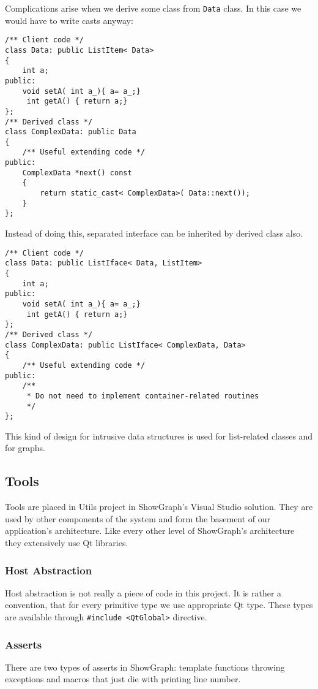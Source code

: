 \documentclass[11pt,twoside,a4paper]{article}
\begin{document}
Complications arise when we derive some class from \lstinline{Data} class. In this case we would have to write casts anyway:
\begin{lstlisting}
/** Client code */
class Data: public ListItem< Data> 
{
    int a;
public:
    void setA( int a_){ a= a_;}
	 int getA() { return a;}
};
/** Derived class */
class ComplexData: public Data
{
    /** Useful extending code */
public:
    ComplexData *next() const
    {
        return static_cast< ComplexData>( Data::next());
    }
};
\end{lstlisting}
Instead of doing this, separated interface can be inherited by derived class also.
\begin{lstlisting}
/** Client code */
class Data: public ListIface< Data, ListItem> 
{
    int a;
public:
    void setA( int a_){ a= a_;}
	 int getA() { return a;}
};
/** Derived class */
class ComplexData: public ListIface< ComplexData, Data>
{
    /** Useful extending code */
public:
    /** 
     * Do not need to implement container-related routines
     */
};
\end{lstlisting}

This kind of design for intrusive data structures is used for list-related classes and for graphs.

\subsection{Tools}
Tools are placed in Utils project in ShowGraph's Visual Studio solution. They are used by other components of the system and form the basement of our application's architecture. Like every other level of ShowGraph's architecture they extensively use Qt libraries.


\subsubsection{Host Abstraction}
Host abstraction is not really a piece of code in this project. It is rather a convention, that for every primitive type we use appropriate Qt type. These types are available through \lstinline{#include <QtGlobal>} directive.

\subsubsection{Asserts}
There are two types of asserts in ShowGraph: template functions throwing exceptions and macros that just die with printing line number.
\end{document}
